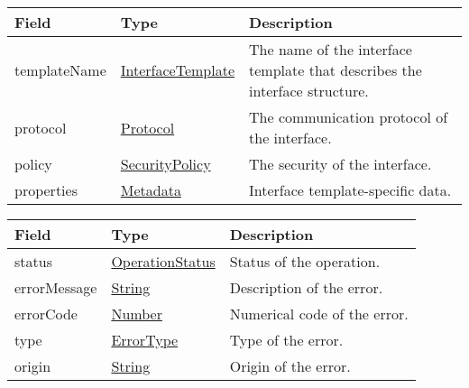 \documentclass[a4paper]{arrowhead}
\newcommand{\pref}[1]{{\textcolor{ArrowheadGrey}{\hyperref[sec:model:primitives:#1]{#1}}}}
\begin{document}
 
\begin{table}[ht!]
\begin{tabularx}{\textwidth}{| p{2.5cm} | p{3cm} | X |} \hline
\rowcolor{gray!33} Field & Type & Description \\ \hline
templateName & \pref{InterfaceTemplate} & The name of the interface template that describes the interface structure. \\ \hline
protocol & \pref{Protocol} & The communication protocol of the interface. \\ \hline
policy & \pref{SecurityPolicy} & The security of the interface. \\ \hline
properties &\hyperref[sec:model:Metadata]{Metadata} & Interface template-specific data. \\ \hline
\end{tabularx}
\end{table}


\begin{table}[ht!]
\begin{tabularx}{\textwidth}{| p{2.5cm} | p{2.6cm} | X |} \hline
\rowcolor{gray!33} Field & Type      & Description \\ \hline
status & \pref{OperationStatus} & Status of the operation. \\ \hline
errorMessage & \pref{String} & Description of the error. \\ \hline
errorCode &\pref{Number}  & Numerical code of the error. \\ \hline
type & \pref{ErrorType} & Type of the error. \\ \hline
origin & \pref{String} & Origin of the error. \\ \hline
\end{tabularx}
\end{table}

\clearpage

\end{document}
